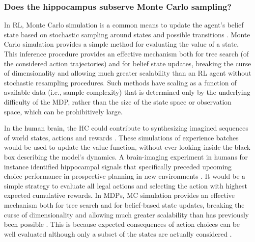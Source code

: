 \documentclass[10pt,letterpaper]{article}
\begin{document}
\subsubsection{Does the hippocampus subserve Monte Carlo sampling?}
In RL, Monte Carlo simulation is a common means to update the agent's belief state
based on stochastic sampling around states and possible transitions \citep{daw2014algorithmic,silver2010monte}.
Monte Carlo simulation provides a simple method for evaluating the value of a state.
This inference procedure provides an effective mechanism both for tree search (of the considered
action trajectories)
and for belief state updates, breaking the curse of dimensionality and allowing much greater scalability than an RL agent without stochastic resampling procedures.
Such methods have scaling as a function of available data (i.e., sample complexity) that
is determined only by the underlying difficulty of the MDP, rather than the size of the state space or observation space,
which can be prohibitively large.

In the human brain,
the HC could contribute to synthesizing imagined sequences of world states,
actions and rewards \citep{aronov2017, chao2017interaction, boyer2008evolutionary}.
These simulations of experience batches
would be used to update the value function, without ever looking inside the black box describing the model's dynamics.
A brain-imaging experiment in humans for instance identified hippocampal signals that specifically preceded upcoming choice performance in prospective planning in new environments
\citep{kaplan2017neural}.
It would be a simple strategy to evaluate
all legal actions and selecting the action with
highest expected cumulative rewards.
In MDPs, MC simulation provides an effective mechanism both for tree search and for belief-based state updates, breaking the curse of dimensionality and allowing much greater scalability than has previously been possible \citep{silver2016mastering}.
This is because expected consequences of action choices can be well evaluated although only a subset of the states are actually considered \citep{daw2014algorithmic}.
\end{document}
